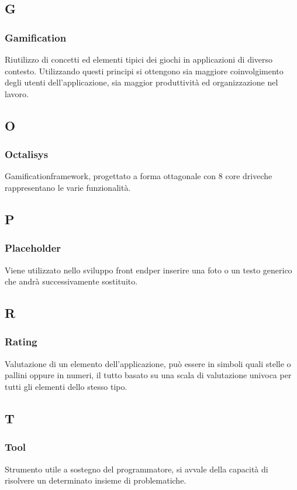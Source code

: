 \subsection*{G}
\subsubsection*{Gamification}
Riutilizzo di concetti ed elementi tipici dei giochi in applicazioni di diverso contesto. Utilizzando
questi principi si ottengono sia maggiore coinvolgimento degli utenti dell'applicazione, sia maggior
produttività ed organizzazione nel lavoro.

\subsection*{O}
\subsubsection*{Octalisys}
Gamification\glosp framework\glo, progettato a forma ottagonale con 8 core drive\glosp che rappresentano le varie funzionalità.

\subsection*{P}
\subsubsection*{Placeholder}
Viene utilizzato nello sviluppo front end\glosp per inserire una foto o un testo generico che andrà successivamente sostituito.

\subsection*{R}
\subsubsection*{Rating}
Valutazione di un elemento dell'applicazione, può essere in simboli quali stelle o pallini oppure in numeri, il tutto basato su una scala di valutazione univoca per tutti gli elementi dello stesso tipo.

\subsection*{T}
\subsubsection*{Tool}
Strumento utile a sostegno del programmatore, si avvale della capacità di risolvere un determinato insieme di problematiche.

